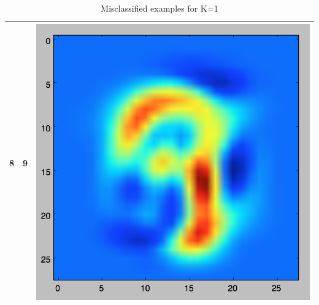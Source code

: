 \documentclass[11pt]{article}
\begin{document}
\begin{table}[!th]
\begin{tabular}{|c|c|c|}
\hline
8 & 9 & \includegraphics[scale=.15]{images/knn1_8_9.png} \\
\hline
\end{tabular}
\caption{Misclassified examples for K=1}
\label{ex:table}
\end{table}
\end{document}
